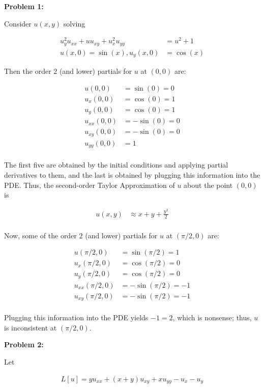 \documentclass[a4paper,12pt]{article}
\begin{document}
{\bf Problem 1:}

Consider $u(x,y)$ solving

\begin{align*}
u_y^2u_{xx}+uu_{xy}+u_x^2u_{yy} &= u^2+1\\
u(x,0) = \sin(x), u_y(x,0) &= \cos(x)
\end{align*}

Then the order $2$ (and lower) partials for $u$ at $(0,0)$ are:

\begin{align*}
u(0,0) &= \sin(0) = 0\\
u_x(0,0) &= \cos(0) = 1\\
u_y(0,0) &= \cos(0) = 1\\
u_{xx}(0,0) &= -\sin(0) = 0\\
u_{xy}(0,0) &= -\sin(0) = 0\\
u_{yy}(0,0) &= 1\\
\end{align*}

The first five are obtained by the initial conditions and applying partial derivatives to them, and the last is obtained by plugging this information into the PDE. Thus, the second-order Taylor Approximation of $u$ about the point $(0,0)$ is

\begin{align*}
u(x,y) &\approx x+y+\frac{y^2}{2} \\
\end{align*}

Now, some of the order $2$ (and lower) partials for $u$ at $(\pi/2, 0)$ are:

\begin{align*}
u(\pi/2,0) &= \sin(\pi/2) = 1\\
u_x(\pi/2,0) &= \cos(\pi/2) = 0\\
u_y(\pi/2,0) &= \cos(\pi/2) = 0\\
u_{xx}(\pi/2,0) &= -\sin(\pi/2) = -1\\
u_{xy}(\pi/2,0) &= -\sin(\pi/2) = -1\\
\end{align*} %

Plugging this information into the PDE yields $-1=2$, which is nonsense; thus, $u$ is inconsistent at $(\pi/2,0)$.

\shunt

{\bf Problem 2:}

Let

\begin{align*}
L[u] = yu_{xx} + (x+y)u_{xy} + xu_{yy} - u_x - u_y
\end{align*}
\end{document}
